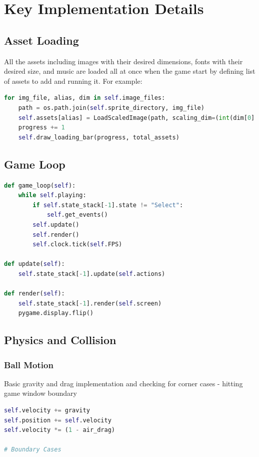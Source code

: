 \documentclass[10.5pt]{article}
\begin{document}
\section{Key Implementation Details}

\subsection{Asset Loading}
All the assets including images with their desired dimensions, fonts with their desired size, and music are loaded all at once when the game start by defining list of assets to add and running it. For example:
\begin{lstlisting}[language=Python, caption={Image Loading}]
for img_file, alias, dim in self.image_files:
    path = os.path.join(self.sprite_directory, img_file)
    self.assets[alias] = LoadScaledImage(path, scaling_dim=(int(dim[0] * self.scale_factor), int(dim[1] * self.scale_factor)))
    progress += 1
    self.draw_loading_bar(progress, total_assets)
\end{lstlisting}

\subsection{Game Loop}
\begin{lstlisting}[language=Python, caption={State Management}]
def game_loop(self):
    while self.playing:
        if self.state_stack[-1].state != "Select":  
            self.get_events()
        self.update()
        self.render()
        self.clock.tick(self.FPS)

def update(self):
    self.state_stack[-1].update(self.actions)

def render(self):
    self.state_stack[-1].render(self.screen)
    pygame.display.flip()
\end{lstlisting}

\subsection{Physics and Collision}
\subsubsection{Ball Motion}
Basic gravity and drag implementation and checking for corner cases - hitting game window boundary

\newpage

\begin{lstlisting}[language=Python, caption={Ball Motion Physics}]
self.velocity += gravity
self.position += self.velocity
self.velocity *= (1 - air_drag)

# Boundary Cases
\end{lstlisting}
\end{document}
